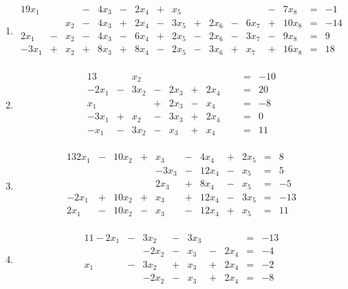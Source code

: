 \documentclass[12pt]{article}
\begin{document}
\begin{enumerate}
\item \begin{alignat*}{19}
x_{1}&{}{}& &{}-{}& 4 x_{3} &{}-{}& 2 x_{4} &{}+{}& x_{5}&{}{}&&{}{}& &{}-{}& 7 x_{8} &{}={}&-1\\ 
&{}{}&x_{2} &{}-{}& 4 x_{3} &{}+{}& 2 x_{4} &{}-{}& 3 x_{5} &{}+{}& 2 x_{6} &{}-{}& 6 x_{7} &{}+{}& 10 x_{8} &{}={}&-14\\ 
2 x_{1} &{}-{}& x_{2} &{}-{}& 4 x_{3} &{}-{}& 6 x_{4} &{}+{}& 2 x_{5} &{}-{}& 2 x_{6} &{}-{}& 3 x_{7} &{}-{}& 9 x_{8} &{}={}&9\\ 
- 3 x_{1} &{}+{}& x_{2} &{}+{}& 8 x_{3} &{}+{}& 8 x_{4} &{}-{}& 2 x_{5} &{}-{}& 3 x_{6} &{}+{}& x_{7} &{}+{}& 16 x_{8} &{}={}&18\\ 
\end{alignat*}

\item \begin{alignat*}{13}
&{}{}&x_{2}&{}{}&&{}{}&&{}{}& &{}={}&-10\\ 
- 2 x_{1} &{}-{}& 3 x_{2} &{}-{}& 2 x_{3} &{}+{}& 2 x_{4}&{}{}& &{}={}&20\\ 
x_{1}&{}{}& &{}+{}& 2 x_{3} &{}-{}& x_{4}&{}{}& &{}={}&-8\\ 
- 3 x_{1} &{}+{}& x_{2} &{}-{}& 3 x_{3} &{}+{}& 2 x_{4}&{}{}& &{}={}&0\\ 
- x_{1} &{}-{}& 3 x_{2} &{}-{}& x_{3} &{}+{}& x_{4}&{}{}& &{}={}&11\\ 
\end{alignat*}

\item \begin{alignat*}{13}
2 x_{1} &{}-{}& 10 x_{2} &{}+{}& x_{3} &{}-{}& 4 x_{4} &{}+{}& 2 x_{5} &{}={}&8\\ 
&{}{}&&{}{}&- 3 x_{3} &{}-{}& 12 x_{4} &{}-{}& x_{5} &{}={}&5\\ 
&{}{}&&{}{}&2 x_{3} &{}+{}& 8 x_{4} &{}-{}& x_{5} &{}={}&-5\\ 
- 2 x_{1} &{}+{}& 10 x_{2} &{}+{}& x_{3} &{}+{}& 12 x_{4} &{}-{}& 3 x_{5} &{}={}&-13\\ 
2 x_{1} &{}-{}& 10 x_{2} &{}-{}& x_{3} &{}-{}& 12 x_{4} &{}+{}& x_{5} &{}={}&11\\ 
\end{alignat*}

\item \begin{alignat*}{11}
- 2 x_{1} &{}-{}& 3 x_{2} &{}-{}& 3 x_{3}&{}{}& &{}={}&-13\\ 
&{}{}&- 2 x_{2} &{}-{}& x_{3} &{}-{}& 2 x_{4} &{}={}&-4\\ 
x_{1} &{}-{}& 3 x_{2} &{}+{}& x_{3} &{}+{}& 2 x_{4} &{}={}&-2\\ 
&{}{}&- 2 x_{2} &{}-{}& x_{3} &{}+{}& 2 x_{4} &{}={}&-8\\ 
\end{alignat*}


\end{enumerate}
\end{document}
